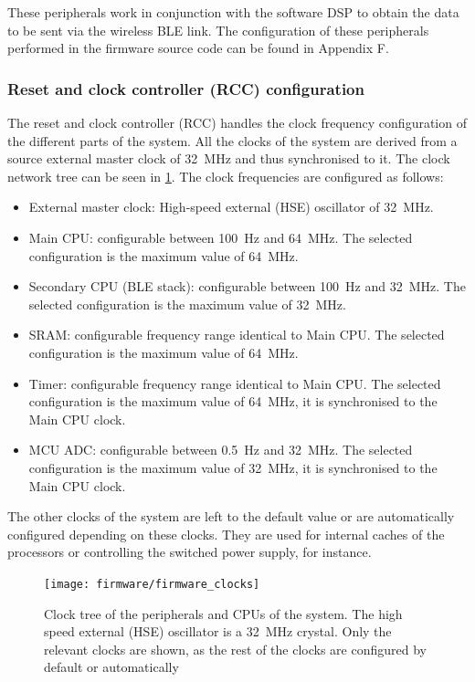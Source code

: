 These peripherals work in conjunction with the software DSP to obtain the data to be sent via the wireless BLE link. The configuration of these peripherals performed in the firmware source code can be found in Appendix F. %

\subsubsection{Reset and clock controller (RCC) configuration} \label{sec:rcc}

The reset and clock controller (RCC) handles the clock frequency configuration of the different parts of the system. All the clocks of the system are derived from a source external master clock of \SI{32}{\mega\hertz} and thus synchronised to it. The clock network tree can be seen in \cref{fig:firmware_clock_tree}. The clock frequencies are configured as follows:
\begin{itemize}
	\item External master clock: High-speed external (HSE) oscillator of \SI{32}{\mega\hertz}.
	\item Main CPU: configurable between \SI{100}{\hertz} and \SI{64}{\mega\hertz}. The selected configuration is the maximum value of \SI{64}{\mega\hertz}.
	\item Secondary CPU (BLE stack): configurable between \SI{100}{\hertz} and \SI{32}{\mega\hertz}. The selected configuration is the maximum value of \SI{32}{\mega\hertz}.
	\item SRAM: configurable frequency range identical to Main CPU. The selected configuration is the maximum value of \SI{64}{\mega\hertz}.
	\item Timer: configurable frequency range identical to Main CPU. The selected configuration is the maximum value of \SI{64}{\mega\hertz}, it is synchronised to the Main CPU clock.
	\item MCU ADC: configurable between \SI{0.5}{\hertz} and \SI{32}{\mega\hertz}. The selected configuration is the maximum value of \SI{32}{\mega\hertz}, it is synchronised to the Main CPU clock.
\end{itemize}

The other clocks of the system are left to the default value or are automatically configured depending on these clocks. They are used for internal caches of the processors or controlling the switched power supply, for instance.

\begin{figure}[ht]
	\centering
	\texttt{[image: firmware/firmware\_clocks]}
	\caption{Clock tree of the peripherals and CPUs of the system. The high speed external (HSE) oscillator is a \SI{32}{\mega\hertz} crystal. Only the relevant clocks are shown, as the rest of the clocks are configured by default or automatically}
	\label{fig:firmware_clock_tree}
\end{figure}

